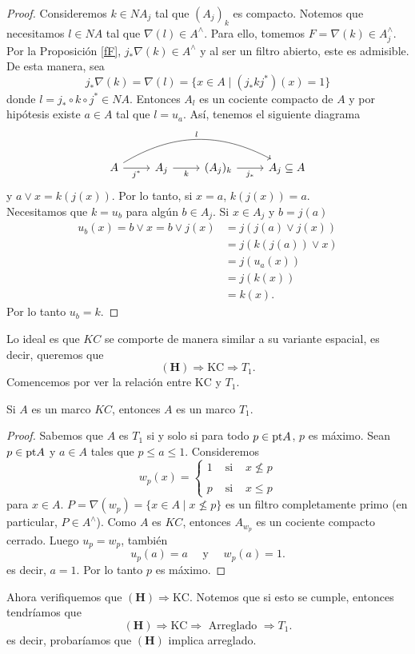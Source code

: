 \begin{proof}
Consideremos $k\in NA_j$ tal que $(A_j)_k$ es compacto. Notemos que necesitamos $l\in NA$ tal que $\nabla(l)\in A^\wedge$. Para ello, tomemos $F=\nabla(k)\in A_j^\wedge$. 
Por la Proposición \ref{fF}, $j_*\nabla(k)\in A^\wedge$ y al ser un filtro abierto, este es admisible. De esta manera, sea 
\[
j_*\nabla(k)=\nabla(l)=\{x\in A\mid (j_*kj^*)(x)=1\}
\]
donde $l=j_*\circ  k\circ j^*\in NA$. Entonces $A_l$ es un cociente compacto de $A$ y por hipótesis existe $a\in A$ tal que $l=u_a$. Así, tenemos el siguiente diagrama 
\[
\begin{tikzcd}
	A \arrow[r, "j^*"'] \arrow[rrr, "l", bend left] & A_j \arrow[r, "k"'] & (A_j)_k \arrow[r, "j_*"'] & A_j\subseteq A
	\end{tikzcd}\]
y $a\vee x=k(j(x))$. Por lo tanto, si $x=a$, $k(j(x))=a$.\\

Necesitamos que $k=u_b$ para algún $b\in A_j$. Si $x\in A_j$ y $b=j(a)$
\[
\begin{split}
u_b(x)= b\vee x= b\vee j(x)& =j(j(a)\vee j(x))\\
& =j(k(j(a))\vee x)\\
& =j(u_a(x))\\
& =j(k(x))\\	
&=k(x).
\end{split}
\]
Por lo tanto $u_b=k$.
\end{proof}

Lo ideal es que $KC$ se comporte de manera similar a su variante espacial, es decir, queremos que 
\[
\mathbf{(H)} \Rightarrow \mathrm{KC} \Rightarrow T_1.
\]
Comencemos por ver la relación entre $\mathrm{KC}$ y $T_1$.

\begin{prop}\label{KCT1}
    Si $A$ es un marco $KC$, entonces $A$ es un marco $T_1$.
\end{prop}

\begin{proof}
Sabemos que $A$ es $T_1$ si y solo si para todo $p\in \mathrm{pt} A$, $p$ es máximo. Sean $p\in \mathrm{pt} A$ y $a\in A$ tales que $p\leq a\leq 1$. Consideremos 
\[
w_p(x)=\left\{\begin{array}{lcc}
1 & \mbox{ si } & x\nleq p\\
\\
p & \mbox{ si } & x\leq p
\end{array}\right.
\]
para $x\in A$. $P=\nabla(w_p)=\{x\in A\mid x\nleq p\}$ es un filtro completamente primo (en particular, $P\in A^\wedge$). Como $A$ es $KC$, entonces $A_{w_p}$ es un cociente compacto cerrado. Luego $u_p=w_p$, también
\[
u_p(a)=a\quad \mbox{ y }\quad w_p(a)=1.
\]
es decir, $a=1$. Por lo tanto $p$ es máximo. 
\end{proof}

Ahora verifiquemos que $\mathbf{(H)} \Rightarrow \mathrm{KC}$. Notemos que si esto se cumple, entonces tendríamos que
\[
\mathbf{(H)} \Rightarrow \mathrm{KC} \Rightarrow \mbox{ Arreglado }\Rightarrow T_1.
\]
es decir, probaríamos que $\mathbf{(H)}$ implica arreglado. 

